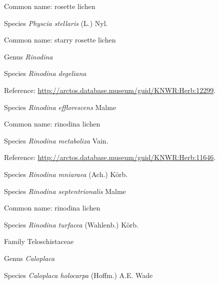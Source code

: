 \documentclass[9pt, article]{memoir}
\begin{document}
\begin{multicols}{2}
Common name: rosette lichen

\vspace{6pt}\noindent\hspace{36pt}Species \textit{Physcia stellaris} (L.) Nyl.


Common name: starry rosette lichen

\vspace{6pt}\noindent\hspace{30pt}Genus \textit{Rinodina}


\vspace{6pt}\noindent\hspace{36pt}Species \textit{Rinodina degeliana}


Reference: 
\url{http://arctos.database.museum/guid/KNWR:Herb:12299}.

\vspace{6pt}\noindent\hspace{36pt}Species \textit{Rinodina efflorescens} Malme


Common name: rinodina lichen

\vspace{6pt}\noindent\hspace{36pt}Species \textit{Rinodina metaboliza} Vain.


Reference: 
\url{http://arctos.database.museum/guid/KNWR:Herb:11646}.

\vspace{6pt}\noindent\hspace{36pt}Species \textit{Rinodina mniaraea} (Ach.) Körb.


\vspace{6pt}\noindent\hspace{36pt}Species \textit{Rinodina septentrionalis} Malme


Common name: rinodina lichen

\vspace{6pt}\noindent\hspace{36pt}Species \textit{Rinodina turfacea} (Wahlenb.) Körb.


\vspace{6pt}\noindent\hspace{24pt}Family Teloschistaceae


\vspace{6pt}\noindent\hspace{30pt}Genus \textit{Caloplaca}


\vspace{6pt}\noindent\hspace{36pt}Species \textit{Caloplaca holocarpa} (Hoffm.) A.E. Wade



\end{multicols}
\end{document}

